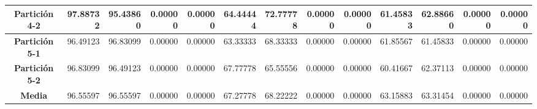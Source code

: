 \documentclass[a4paper,11pt]{article}
\begin{document}
\begin{table}[H]
\begin{adjustbox}{width=1.1\textwidth}
\begin{tabular}{|c|r|r|r|r|r|r|r|r|r|r|r|r|}
    \textbf{Partición 4-2} & 97.88732 & 95.43860 & 0.00000 & 0.00000 & 64.44444 & 72.77778 & 0.00000 & 0.00000 & 61.45833 & 62.88660 & 0.00000 & 0.00000 \\ \hline
    \textbf{Partición 5-1} & 96.49123 & 96.83099 & 0.00000 & 0.00000 & 63.33333 & 68.33333 & 0.00000 & 0.00000 & 61.85567 & 61.45833 & 0.00000 & 0.00000 \\ \hline
    \textbf{Partición 5-2} & 96.83099 & 96.49123 & 0.00000 & 0.00000 & 67.77778 & 65.55556 & 0.00000 & 0.00000 & 60.41667 & 62.37113 & 0.00000 & 0.00000 \\ \hline
    \textbf{Media} & 96.55597 & 96.55597 & 0.00000 & 0.00000 & 67.27778 & 68.22222 & 0.00000 & 0.00000 & 63.15883 & 63.31454 & 0.00000 & 0.00000 \\ \hline
    \end{tabular}
    \end{adjustbox}
    \label{NN3}
  \end{table}
  
\end{document}
